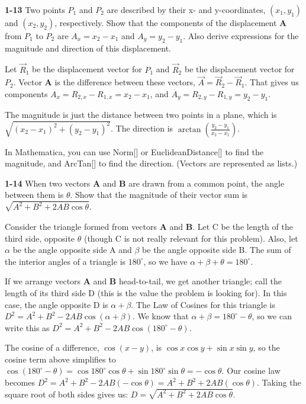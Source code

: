\documentclass{amsart}
\begin{document}
\textbf{1-13} Two points $P_{1}$ and $P_{2}$ are described by their x- and y-coordinates,
$(x_{1}, y_{1})$ and $(x_{2}, y_{2})$, respectively.
Show that the components of the displacement
\textbf{A} from $P_{1}$ to $P_{2}$ are $A_{x} = x_{2}-x_{1}$ and $A_{y} = y_{2}-y_{1}$.
Also derive expressions for the magnitude and direction of this displacement.

Let $\vec R_{1}$ be the displacement vector for $P_{1}$ and $\vec R_{2}$ be the displacement
vector for $P_{2}$.  Vector \textbf{A} is the difference between these vectors,
$\vec A = \vec R_{2} - \vec R_{1}$.
That gives us components $A_{x} = R_{2,x} - R_{1,x} = x_{2} - x_{1}$, and
$A_{y} = R_{2,y} - R_{1,y} = y_{2} - y_{1}$.

The magnitude is just the distance between two points in a plane, which is
$\sqrt{(x_{2}-x_{1})^{2}+(y_{2}-y_{1})^{2}}$.
The direction is $\arctan(\frac{y_{2}-y_{1}}{x_{2}-x_{1}})$.

In Mathematica, you can use Norm[] or EuclideanDistance[] to find the magnitude,
and ArcTan[] to find the direction.  (Vectors are represented as lists.)

\textbf{1-14} When two vectors \textbf{A} and \textbf{B} are drawn from a common point,
the angle between them is $\theta$.
Show that the magnitude of their vector sum is $\sqrt{A^{2}+B^{2}+2 A B \cos \theta}$.

Consider the triangle formed from vectors \textbf{A} and \textbf{B}.  Let C be the length
of the third side, opposite $\theta$ (though C is not really relevant for this problem).
Also, let $\alpha$ be the angle opposite side A
and $\beta$ be the angle opposite side B.
The sum of the interior angles of a triangle is $180^{\circ}$, so we have $\alpha + \beta + \theta = 180^{\circ}$.

If we arrange vectors \textbf{A} and \textbf{B} head-to-tail, we get another triangle;
call the length of its third side D (this is the value the problem is looking for).
  In this case, the angle opposite D is $\alpha + \beta$.
The Law of Cosines for this triangle is $D^2 = A^2+B^2-2 A B \cos (\alpha + \beta)$.
We know that $\alpha + \beta = 180^\circ - \theta$, so we can write this as $D^2 = A^2+B^2-2 A B \cos (180^\circ - \theta)$.

The cosine of a difference, $\cos (x-y)$, is $\cos x \cos y + \sin x \sin y$,
so the cosine term above simplifies to
$\cos (180^\circ - \theta) = \cos 180^\circ \cos \theta + \sin 180^\circ \sin \theta = - \cos \theta$.
Our cosine law becomes $D^2 = A^2 + B^2 - 2 A B (-\cos \theta) = A^2 + B^2 + 2 A B (\cos \theta)$.
Taking the square root of both sides gives us: $D = \sqrt{A^2 + B^2 + 2 A B \cos \theta}$.
\end{document}

